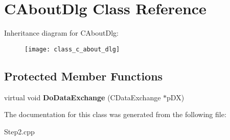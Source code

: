 \hypertarget{class_c_about_dlg}{}\section{C\+About\+Dlg Class Reference}
\label{class_c_about_dlg}
Inheritance diagram for C\+About\+Dlg\+:\begin{figure}[H]
\begin{center}
\leavevmode
\texttt{[image: class\_c\_about\_dlg]}
\end{center}
\end{figure}
\subsection*{Protected Member Functions}
\begin{DoxyCompactItemize}
\item 
\mbox{\label{class_c_about_dlg_ab83db7484fec957282d7d5a21aed4df4}} 
virtual void {\bfseries Do\+Data\+Exchange} (C\+Data\+Exchange $\ast$p\+DX)
\end{DoxyCompactItemize}


The documentation for this class was generated from the following file\+:\begin{DoxyCompactItemize}
\item 
Step2.\+cpp\end{DoxyCompactItemize}
